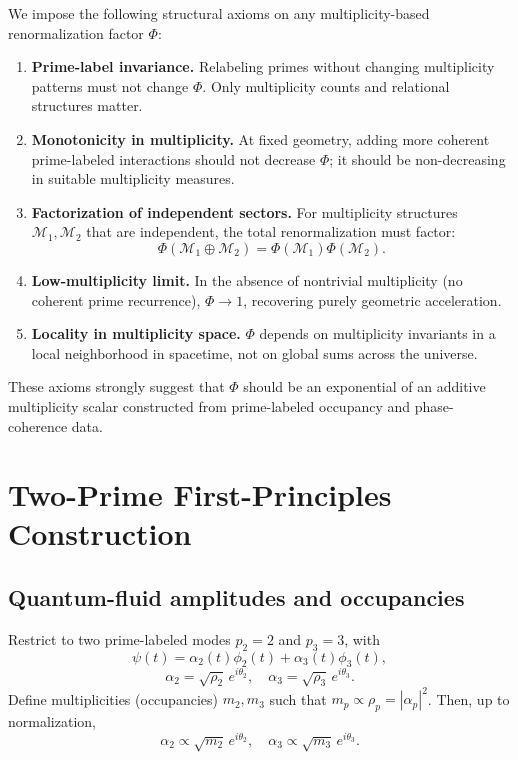 \documentclass[11pt]{article}
\begin{document}
We impose the following structural axioms on any multiplicity-based renormalization factor \(\Phi\):

\begin{enumerate}
\item \textbf{Prime-label invariance.} Relabeling primes without changing multiplicity patterns must not change \(\Phi\). Only multiplicity counts and relational structures matter.

\item \textbf{Monotonicity in multiplicity.} At fixed geometry, adding more coherent prime-labeled interactions should not decrease \(\Phi\); it should be non-decreasing in suitable multiplicity measures.

\item \textbf{Factorization of independent sectors.} For multiplicity structures \(\mathcal{M}_1,\mathcal{M}_2\) that are independent, the total renormalization must factor:
\[
\Phi(\mathcal{M}_1\oplus\mathcal{M}_2) = \Phi(\mathcal{M}_1)\Phi(\mathcal{M}_2).
\]

\item \textbf{Low-multiplicity limit.} In the absence of nontrivial multiplicity (no coherent prime recurrence), \(\Phi\to 1\), recovering purely geometric acceleration.

\item \textbf{Locality in multiplicity space.} \(\Phi\) depends on multiplicity invariants in a local neighborhood in spacetime, not on global sums across the universe.
\end{enumerate}

These axioms strongly suggest that \(\Phi\) should be an exponential of an additive multiplicity scalar constructed from prime-labeled occupancy and phase-coherence data.

\section{Two-Prime First-Principles Construction}

\subsection{Quantum-fluid amplitudes and occupancies}

Restrict to two prime-labeled modes \(p_2=2\) and \(p_3=3\), with
\[
\psi(t) = \alpha_2(t)\phi_2(t) + \alpha_3(t)\phi_3(t),
\]
\[
\alpha_2 = \sqrt{\rho_2}\,e^{i\theta_2},\quad
\alpha_3 = \sqrt{\rho_3}\,e^{i\theta_3}.
\]
Define multiplicities (occupancies) \(m_2,m_3\) such that \(m_p \propto \rho_p = |\alpha_p|^2\). Then, up to normalization,
\[
\alpha_2 \propto \sqrt{m_2}\,e^{i\theta_2},\quad
\alpha_3 \propto \sqrt{m_3}\,e^{i\theta_3}.
\]
\end{document}
